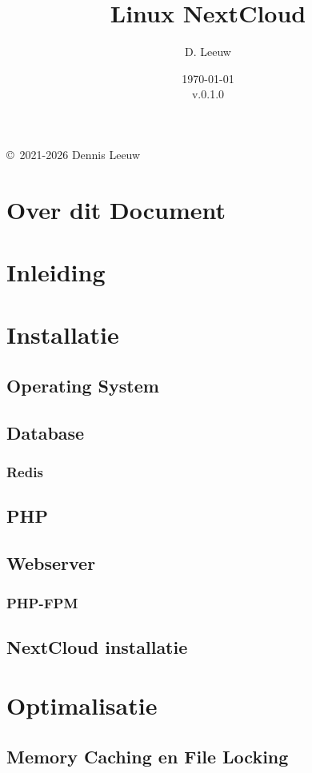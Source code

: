 \documentclass[a4paper,12pt,twoside,openright,titlepage]{book}
\author{D. Leeuw}
\title{Linux NextCloud}
\date{\today\\v.0.1.0}
\begin{document}

\maketitle

\copyright\ 2021-2026 Dennis Leeuw\\




\frontmatter
\chapter{Over dit Document}

\tableofcontents

\mainmatter
\chapter{Inleiding}


\chapter{Installatie}
\section{Operating System}


\section{Database}

\subsection{Redis}

\section{PHP}


\section{Webserver}

\subsection{PHP-FPM}

\section{NextCloud installatie}


\chapter{Optimalisatie}
\section{Memory Caching en File Locking}


\printindex
\end{document}
